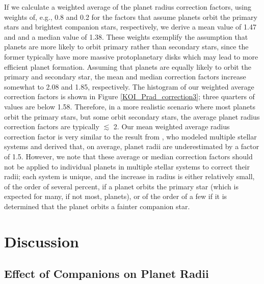 \documentclass[twocolumn,appendixfloats]{aastex6}
\begin{document}
If we calculate a weighted average of the planet radius correction factors,
using weights of, e.g., 0.8 and 0.2 for the factors that assume planets orbit 
the primary stars and brightest companion stars, respectively, we derive a
mean value of 1.47 and and a median value of 1.38. These weights
exemplify the assumption that planets are more likely to orbit primary rather 
than secondary stars, since the former typically have more massive 
protoplanetary disks \citep[e.g.,][]{akeson14} which may lead to more 
efficient planet formation. Assuming that planets are equally likely to 
orbit the primary and secondary star, the mean and median correction factors 
increase somewhat to 2.08 and 1.85, respectively.
The histogram of our weighted average correction factors is shown in Figure 
\ref{KOI_Prad_correction3}; three quarters of values are below 1.58. 
Therefore, in a more realistic scenario where most planets orbit the primary stars, 
but some orbit secondary stars, the average planet radius correction factors are 
typically $\lesssim$ 2. Our mean weighted average radius correction
factor is very similar to the result from \citet{ciardi15}, who modeled multiple
stellar systems and derived that, on average, planet radii are underestimated 
by a factor of 1.5. However, we note that these average or median correction 
factors should not be applied to individual planets in multiple stellar systems 
to correct their radii; each system is unique, and the increase in radius is either 
relatively small, of the order of several percent, if a planet orbits the primary star 
(which is expected for many, if not most, planets), or of the order of a few if it
is determined that the planet orbits a fainter companion star.


\section{Discussion}
\label{disc}

\subsection{Effect of Companions on Planet Radii}
\end{document}
